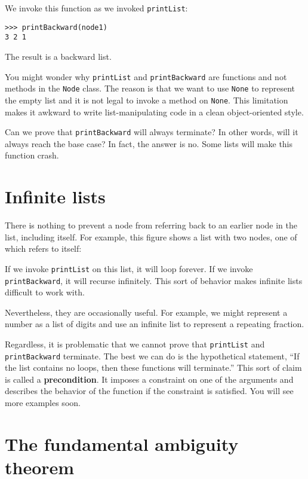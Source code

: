 We invoke this function as we invoked {\tt printList}:

\beforeverb
\begin{verbatim}
>>> printBackward(node1)
3 2 1
\end{verbatim}
\afterverb
%
The result is a backward list.

You might wonder why {\tt printList} and {\tt printBackward} are
functions and not methods in the {\tt Node} class.  The reason is that
we want to use {\tt None} to represent the empty list and it is not
legal to invoke a method on {\tt None}.  This limitation makes it
awkward to write list-manipulating code in a clean object-oriented
style.

Can we prove that {\tt printBackward} will always terminate?   In other
words, will it always reach the base case?  In fact, the answer
is no.  Some lists will make this function crash.


\section{Infinite lists}

There is nothing to prevent a node from referring back to
an earlier node in the list, including itself.  For example,
this figure shows a list with two nodes, one of which refers
to itself:

\beforefig
\centerline{}
\afterfig

If we invoke {\tt printList} on this list, it will loop forever.
If we invoke {\tt printBackward}, it will recurse infinitely.
This sort of behavior makes infinite lists difficult to work
with.

Nevertheless, they are occasionally useful.  For example, we
might represent a number as a list of digits and use an infinite
list to represent a repeating fraction.

Regardless, it is problematic that we cannot prove that {\tt printList}
and {\tt printBackward} terminate.  The best we can do is the
hypothetical statement, ``If the list contains no loops, then these
functions will terminate.''  This sort of claim is called a {\bf
precondition}.  It imposes a constraint on one of the arguments and
describes the behavior of the function if the constraint is satisfied.
You will see more examples soon.



\section{The fundamental ambiguity theorem}

